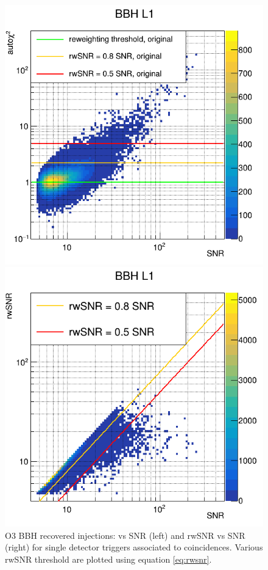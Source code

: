 \begin{figure}[ht]
    \centering
    \begin{minipage}{0.45\linewidth}
        \centering
        \includegraphics[width=\linewidth]{sectionImprovement/rwSNR/cSnrAchi2_L1.png}
    \end{minipage}
    \hfill
    \begin{minipage}{0.45\linewidth}
        \centering
        \includegraphics[width=\linewidth]{sectionImprovement/rwSNR/cSnrRw_L1.png}
    \end{minipage}
    \hfill
    \caption{O3 BBH recovered injections: \achi vs SNR (left) and rwSNR vs SNR (right) for single detector triggers associated to coincidences. Various rwSNR threshold are plotted using equation \ref{eq:rwsnr}.}
    \label{fig:achi2_vs_snr}
\end{figure}



